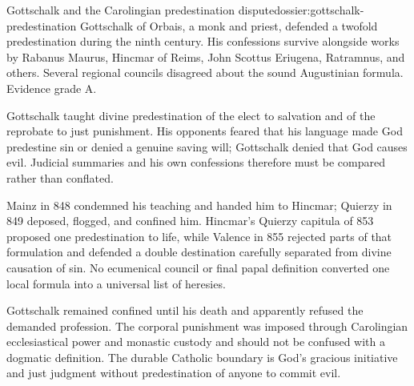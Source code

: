 \begin{heresydossier}{Gottschalk and the Carolingian predestination dispute}{dossier:gottschalk-predestination}
\objectfield Gottschalk of Orbais, a monk and priest, defended a twofold predestination during the ninth century. His confessions survive alongside works by Rabanus Maurus, Hincmar of Reims, John Scottus Eriugena, Ratramnus, and others. Several regional councils disagreed about the sound Augustinian formula. Evidence grade A.

\propositionfield Gottschalk taught divine predestination of the elect to salvation and of the reprobate to just punishment. His opponents feared that his language made God predestine sin or denied a genuine saving will; Gottschalk denied that God causes evil. Judicial summaries and his own confessions therefore must be compared rather than conflated.

\responsefield Mainz in 848 condemned his teaching and handed him to Hincmar; Quierzy in 849 deposed, flogged, and confined him. Hincmar's Quierzy capitula of 853 proposed one predestination to life, while Valence in 855 rejected parts of that formulation and defended a double destination carefully separated from divine causation of sin. No ecumenical council or final papal definition converted one local formula into a universal list of heresies.

\aftermathfield Gottschalk remained confined until his death and apparently refused the demanded profession. The corporal punishment was imposed through Carolingian ecclesiastical power and monastic custody and should not be confused with a dogmatic definition. The durable Catholic boundary is God's gracious initiative and just judgment without predestination of anyone to commit evil.
\end{heresydossier}

